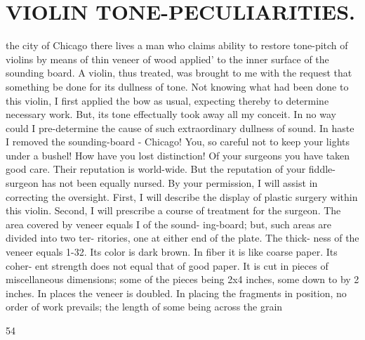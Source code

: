 \documentclass{article}
\begin{document}
\section*{VIOLIN TONE-PECULIARITIES.}
the city of Chicago there lives a man who claims ability to restore tone-pitch of violins by means of thin veneer of wood applied' to the inner surface of the sounding board. A violin, thus treated, was brought to me with the request that something be done for its dullness of tone. Not knowing what had been done to this violin, I first applied the bow as usual, expecting thereby to determine necessary work. But, its tone effectually took away all my conceit. In no way could I pre-determine the cause of such extraordinary dullness of sound. In haste I removed the sounding-board - Chicago! You, so careful not to keep your lights under a bushel! How have you lost distinction! Of your surgeons you have taken good care. Their reputation is world-wide. But the reputation of your fiddle-surgeon has not been equally nursed. By your permission, I will assist in correcting the oversight. First, I will describe the display of plastic surgery within this violin. Second, I will prescribe a course of treatment for the surgeon. The area covered by veneer equals I of the sound- ing-board; but, such areas are divided into two ter- ritories, one at either end of the plate. The thick- ness of the veneer equals 1-32. Its color is dark brown. In fiber it is like coarse paper. Its coher- ent strength does not equal that of good paper. It is cut in pieces of miscellaneous dimensions; some of the pieces being 2x4 inches, some down to by 2 inches. In places the veneer is doubled. In placing the fragments in position, no order of work prevails; the length of some being across the grain

54
\end{document}
